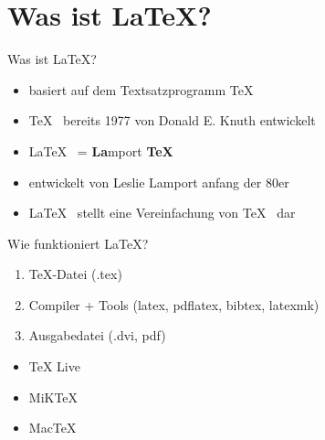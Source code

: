 
\section{Was ist \LaTeX ?}
%
\begin{frame}{Was ist \LaTeX ?}
	\begin{itemize}
	\item basiert auf dem Textsatzprogramm \TeX
	\item \TeX \mbox{ } bereits 1977 von Donald E. Knuth entwickelt
	\item \LaTeX \mbox{ } = \textbf{La}mport \textbf{TeX}
	\item entwickelt von Leslie Lamport anfang der 80er 
	\item \LaTeX \mbox{ } stellt eine Vereinfachung von \TeX \mbox{ } dar
	\end{itemize}
\end{frame}

\begin{frame}{Wie funktioniert \LaTeX?}
	\begin{enumerate}
	\item \TeX -Datei (.tex)
	\item Compiler + Tools (latex, pdflatex, bibtex, latexmk)
	\item Ausgabedatei (.dvi, pdf)
	\end{enumerate}

	\begin{itemize}
	\item TeX Live
	\item MiKTeX
	\item MacTeX
	\end{itemize}
\end{frame}





